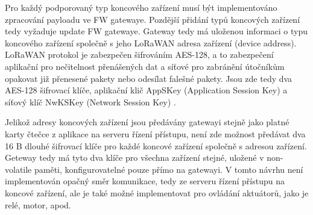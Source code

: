    

Pro každý podporovaný typ koncového zařízení musí být implementováno zpracování payloadu ve FW gatewaye. Pozdější přidání typů koncových zařízení tedy vyžaduje update FW gatewaye.
Gateway tedy má uloženou informaci o typu koncového zařízení společně s jeho LoRaWAN adresa zařízení (device address).
LoRaWAN protokol je zabezpečen šifrováním AES-128, a to zabezpečení aplikační pro nečitelnost přenášených dat a síťové pro zabránění útočníkům opakovat již přenesené pakety nebo odesílat falešné pakety. Jsou zde tedy dva AES-128 šifrovací klíče, aplikační klič AppSKey (Application Session Key) a síťový klíč NwKSKey (Network Session Key) \cite{lorawan_specification} \cite{lwSecur}.

Jelikož adresy koncových zařízení jsou předávány gatewayi stejně jako platné karty čtečce z aplikace na serveru řízení přístupu, není zde možnost předávat dva 16 B dlouhé šifrovací klíče pro každé koncové zařízení společně s adresou zařízení. Geteway tedy má tyto dva klíče pro všechna zařízení stejné, uložené v non-volatile paměti, konfigurovatelné pouze přímo na gatewayi.
V tomto návrhu není implementován opačný směr komunikace, tedy ze serveru řízení přístupu na koncové zařízení, ale je také možné implementovat pro ovládání aktuátorů, jako je relé, motor, apod.


